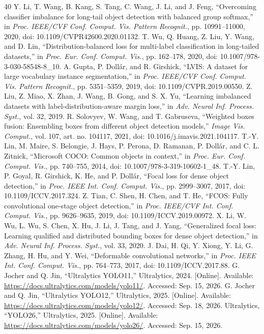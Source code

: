 \documentclass[journal]{IEEEtran}
\begin{document}
\begin{thebibliography}{40}
 Y. Li, T. Wang, B. Kang, S. Tang, C. Wang, J. Li, and J. Feng, ``Overcoming classifier imbalance for long-tail object detection with balanced group softmax,'' in \emph{Proc. IEEE/CVF Conf. Comput. Vis. Pattern Recognit.}, pp. 10991--11000, 2020, doi: 10.1109/CVPR42600.2020.01132.
 T. Wu, Q. Huang, Z. Liu, Y. Wang, and D. Lin, ``Distribution-balanced loss for multi-label classification in long-tailed datasets,'' in \emph{Proc. Eur. Conf. Comput. Vis.}, pp. 162--178, 2020, doi: 10.1007/978-3-030-58548-8\_10.
 A. Gupta, P. Dollár, and R. Girshick, ``LVIS: A dataset for large vocabulary instance segmentation,'' in \emph{Proc. IEEE/CVF Conf. Comput. Vis. Pattern Recognit.}, pp. 5351--5359, 2019, doi: 10.1109/CVPR.2019.00550.
 Z. Liu, Z. Miao, X. Zhan, J. Wang, B. Gong, and S. X. Yu, ``Learning imbalanced datasets with label-distribution-aware margin loss,'' in \emph{Adv. Neural Inf. Process. Syst.}, vol. 32, 2019.
 R. Solovyev, W. Wang, and T. Gabruseva, ``Weighted boxes fusion: Ensembling boxes from different object detection models,'' \emph{Image Vis. Comput.}, vol. 107, art. no. 104117, 2021, doi: 10.1016/j.imavis.2021.104117.
 T.-Y. Lin, M. Maire, S. Belongie, J. Hays, P. Perona, D. Ramanan, P. Dollár, and C. L. Zitnick, ``Microsoft COCO: Common objects in context,'' in \emph{Proc. Eur. Conf. Comput. Vis.}, pp. 740--755, 2014, doi: 10.1007/978-3-319-10602-1\_48.
 T.-Y. Lin, P. Goyal, R. Girshick, K. He, and P. Dollár, ``Focal loss for dense object detection,'' in \emph{Proc. IEEE Int. Conf. Comput. Vis.}, pp. 2999--3007, 2017, doi: 10.1109/ICCV.2017.324.
 Z. Tian, C. Shen, H. Chen, and T. He, ``FCOS: Fully convolutional one-stage object detection,'' in \emph{Proc. IEEE/CVF Int. Conf. Comput. Vis.}, pp. 9626--9635, 2019, doi: 10.1109/ICCV.2019.00972.
 X. Li, W. Wu, L. Wu, S. Chen, X. Hu, J. Li, J. Tang, and J. Yang, ``Generalized focal loss: Learning qualified and distributed bounding boxes for dense object detection,'' in \emph{Adv. Neural Inf. Process. Syst.}, vol. 33, 2020.
 J. Dai, H. Qi, Y. Xiong, Y. Li, G. Zhang, H. Hu, and Y. Wei, ``Deformable convolutional networks,'' in \emph{Proc. IEEE Int. Conf. Comput. Vis.}, pp. 764--773, 2017, doi: 10.1109/ICCV.2017.88.
 G. Jocher and Q. Jin, ``Ultralytics YOLO11,'' Ultralytics, 2024. [Online]. Available: \url{https://docs.ultralytics.com/models/yolo11/}. Accessed: Sep. 15, 2026.
 G. Jocher and Q. Jin, ``Ultralytics YOLO12,'' Ultralytics, 2025. [Online]. Available: \url{https://docs.ultralytics.com/models/yolo12/}. Accessed: Sep. 18, 2026.
 Ultralytics, ``YOLO26,'' Ultralytics, 2025. [Online]. Available: \url{https://docs.ultralytics.com/models/yolo26/}. Accessed: Sep. 15, 2026.
\end{thebibliography}
\end{document}
